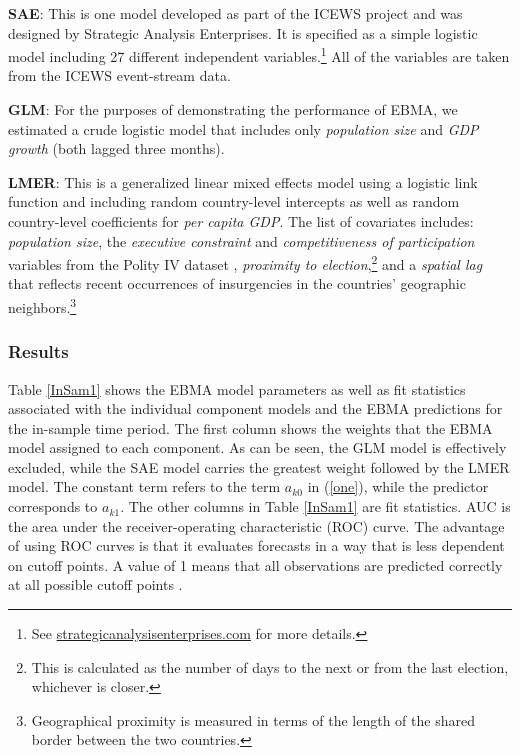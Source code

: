 \documentclass[pdftex,12pt,fullpage,oneside]{amsart}
\begin{document}
\begin{list}{}{\leftmargin=1em}
\item \textbf{SAE}: This is one model developed as part of the ICEWS
  project and was designed by Strategic Analysis Enterprises. It is
  specified as a simple logistic model including 27 different
  independent variables.\footnote{See
    \url{strategicanalysisenterprises.com} for more details.}  All of the variables are taken from the ICEWS
  event-stream data.
\item \textbf{GLM}: For the purposes of demonstrating the performance
  of EBMA, we estimated a crude logistic model that
  includes only \textit{population size} and \textit{GDP growth} (both
  lagged three months).
\item \textbf{LMER}: This is a generalized linear mixed effects model
  using a logistic link function and including random country-level
  intercepts as well as random country-level coefficients for
  \textit{per capita GDP}.  The list of covariates includes:
  \textit{population size}, the \textit{executive constraint} and
  \textit{competitiveness of participation} variables from the Polity
  IV dataset \citep{PolityIV}, \textit{proximity to
    election},\footnote{This is calculated as the number of days to
    the next or from the last election, whichever is closer.} and a
  \textit{spatial lag} that reflects recent occurrences of
  insurgencies in the countries' geographic
  neighbors.\footnote{Geographical proximity is measured in terms of
    the length of the shared border between the two countries.}
\end{list}

\subsubsection{Results}

Table \ref{InSam1} shows the EBMA model parameters as well as fit
statistics associated with the individual component models and the
EBMA predictions for the in-sample time period. The first column shows
the weights that the EBMA model assigned to each component. As can be
seen, the GLM model is effectively excluded, while the SAE model
carries the greatest weight followed by the LMER model.  The constant
term refers to the term $a_{k0}$ in (\ref{one}), while the predictor
corresponds to $a_{k1}$.  The other columns in Table \ref{InSam1} are
fit statistics.  AUC is the area under the receiver-operating
characteristic (ROC) curve. The advantage of using ROC curves is that
it evaluates forecasts in a way that is less dependent on cutoff
points.  A value of 1 means that all observations are predicted
correctly at all possible cutoff points \citep{King:Zeng:2001}.
\end{document}
